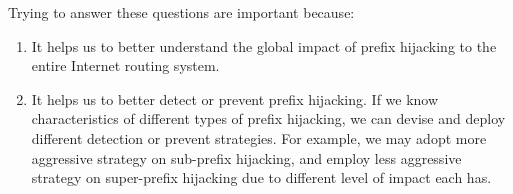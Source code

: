 \documentclass[11pt]{article}
\begin{document}
Trying to answer these questions are important because:
\begin{enumerate}
\item It helps us to better understand the global impact of prefix
  hijacking to the entire Internet routing system.
\item It helps us to better detect or prevent prefix hijacking. If we
  know characteristics of different types of prefix hijacking, we can
  devise and deploy different detection or prevent strategies. For
  example, we may adopt more aggressive strategy on sub-prefix
  hijacking, and employ less aggressive strategy on super-prefix
  hijacking due to different level of impact each has.
\end{enumerate}
\end{document}
